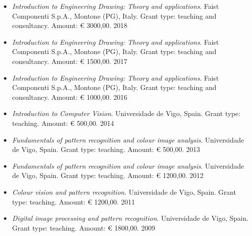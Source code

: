 \documentclass[11pt]{article}
\begin{document}
\begin{itemize}
	\item \emph{Introduction to Engineering Drawing: Theory and applications}. Faist Componenti S.p.A., Montone (PG), Italy. Grant type: teaching and consultancy. Amount: € 3000,00. \hfill 2018
\end{itemize}

\begin{itemize}
	\item \emph{Introduction to Engineering Drawing: Theory and applications}. Faist Componenti S.p.A., Montone (PG), Italy. Grant type: teaching and consultancy. Amount: € 1500,00. \hfill 2017
\end{itemize}

\begin{itemize}
	\item \emph{Introduction to Engineering Drawing: Theory and applications}. Faist Componenti S.p.A., Montone (PG), Italy. Grant type: teaching and consultancy. Amount: € 1000,00. \hfill 2016
\end{itemize}

\begin{itemize}
	\item \emph{Introduction to Computer Vision}. Universidade de Vigo, Spain. Grant type: teaching. Amount: € 500,00. \hfill 2014
\end{itemize}

\begin{itemize}
	\item \emph{Fundamentals of pattern recognition and colour image analysis}. Universidade de Vigo, Spain. Grant type: teaching. Amount: € 500,00. \hfill 2013
\end{itemize}

\begin{itemize}
	\item \emph{Fundamentals of pattern recognition and colour image analysis}. Universidade de Vigo, Spain. Grant type: teaching. Amount: € 1200,00. \hfill 2012
\end{itemize}

\begin{itemize}
	\item \emph{Colour vision and pattern recognition}. Universidade de Vigo, Spain. Grant type: teaching. Amount: € 1200,00. \hfill 2011
\end{itemize}

\begin{itemize}
	\item \emph{Digital image processing and pattern recognition}. Universidade de Vigo, Spain. Grant type: teaching. Amount: € 1800,00. \hfill 2009
\end{itemize}
\end{document}
